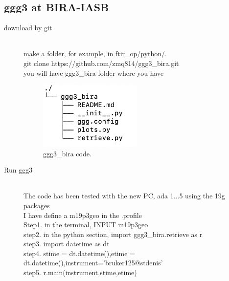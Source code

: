 \documentclass{article}
\begin{document}
\subsection{ggg3 at BIRA-IASB }
\label{download by git}
\begin{description}
\item[download by git]\hfill \\
make a folder, for example, in ftir\_op/python/. \\
git clone https://github.com/zmq814/ggg3\_bira.git \\
you will have ggg3\_bira folder where you have \\
\begin{figure}[h]
\begin{center}
\includegraphics[width=0.5\textwidth]{./figures/ggg3.png} 
\caption{ggg3\_bira code.}
\end{center}
\end{figure}
\item[Run ggg3] \hfill \\
The code has been tested with the new PC, ada 1...5 using the 19g packages \\
I have define a m19p3geo in the .profile\\
Step1. in the terminal, INPUT m19p3geo \\
step2. in the python section, import ggg3\_bira.retrieve as r\\
step3. import datetime as dt\\
step4. stime = dt.datetime(),etime = dt.datetime(),instrument='bruker125@stdenis'\\
step5. r.main(instrument,stime,etime)\\

\end{description} 
 
\end{document}
